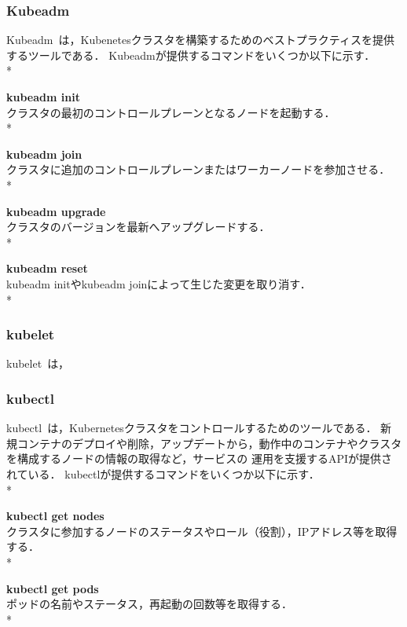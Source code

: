 \subsubsection{Kubeadm}

Kubeadm~\cite{Kubeadm}は，Kubenetesクラスタを構築するためのベストプラクティスを提供するツールである．
Kubeadmが提供するコマンドをいくつか以下に示す．\\*

{\bf kubeadm init}\\
クラスタの最初のコントロールプレーンとなるノードを起動する．\\*

{\bf kubeadm join}\\
クラスタに追加のコントロールプレーンまたはワーカーノードを参加させる．\\*

{\bf kubeadm upgrade}\\
クラスタのバージョンを最新へアップグレードする．\\*

{\bf kubeadm reset}\\
kubeadm initやkubeadm joinによって生じた変更を取り消す．\\*

\subsubsection{kubelet}

kubelet~\cite{kubelet}は，

\subsubsection{kubectl}

kubectl~\cite{kubectl}は，Kubernetesクラスタをコントロールするためのツールである．
新規コンテナのデプロイや削除，アップデートから，動作中のコンテナやクラスタを構成するノードの情報の取得など，サービスの
運用を支援するAPIが提供されている．
kubectlが提供するコマンドをいくつか以下に示す．\\*

{\bf kubectl get nodes}\\
クラスタに参加するノードのステータスやロール（役割），IPアドレス等を取得する．\\*

{\bf kubectl get pods}\\
ポッドの名前やステータス，再起動の回数等を取得する．\\*

